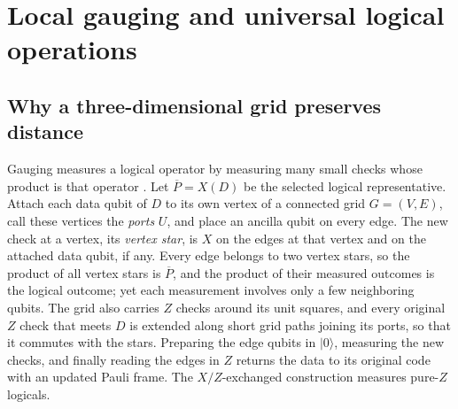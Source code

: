 \section{Local gauging and universal logical operations}
\label{sec:measurements}
\subsection{Why a three-dimensional grid preserves distance}
Gauging measures a logical operator by measuring many small checks whose
product is that operator \cite{WilliamsonYoderGauging}.  Let
$\overline P=X(D)$ be the selected logical representative.  Attach each data
qubit of $D$ to its own vertex of a connected grid $G=(V,E)$, call these
vertices the \emph{ports} $U$, and place an ancilla qubit on every edge.  The
new check at a vertex, its \emph{vertex star}, is $X$ on the edges at that
vertex and on the attached data qubit, if any.  Every edge belongs to two
vertex stars, so the product of all vertex stars is $\overline P$, and the
product of their measured outcomes is the logical outcome; yet each
measurement involves only a few neighboring qubits.  The grid also carries
$Z$ checks around its unit squares, and every original $Z$ check that meets
$D$ is extended along short grid paths joining its ports, so that it commutes
with the stars.  Preparing the edge qubits in $|0\rangle$, measuring the new
checks, and finally reading the edges in $Z$ returns the data to its original
code with an updated Pauli frame.  The $X/Z$-exchanged construction measures
pure-$Z$ logicals.

